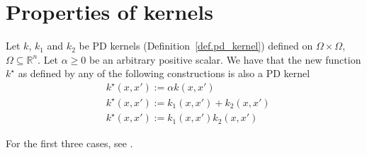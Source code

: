 


\chapter{Properties of kernels}

Let $k$, $k_1$ and $k_2$ be PD kernels (Definition~\ref{def.pd_kernel}) defined on $\Omega \times \Omega$, $\Omega \subseteq \mathbb{R}^n$. Let $\alpha \geq 0$ be an arbitrary positive scalar. We have that the new function $k^\star$ as defined by any of the following constructions is also a PD kernel
\begin{align}
	& k^\star(x,x') := \alpha k(x,x') \\
	& k^\star(x,x') := k_1(x,x') + k_2(x,x') \\
	& k^\star(x,x') := k_1(x,x') k_2(x,x') 
\end{align}

\begin{my_proof}
	For the first three cases, see \cite[§4]{steinwart2008svm_book}.
\end{my_proof}


